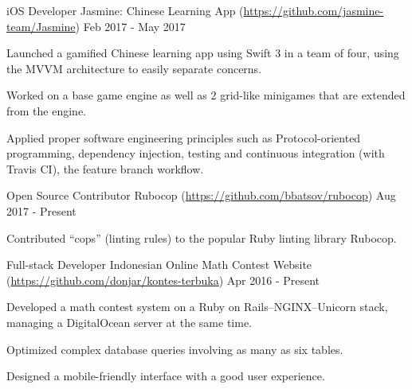 

\begin{cventries}

	\cventry
	{iOS Developer} %
	{Jasmine: Chinese Learning App (\url{https://github.com/jasmine-team/Jasmine})} %
	{} %
	{Feb 2017 - May 2017} %
	{
		\begin{cvitems} %
		\item {Launched a gamified Chinese learning app using Swift 3 in a team of four, using the MVVM architecture to easily separate concerns.}
		\item {Worked on a base game engine as well as 2 grid-like minigames that are extended from the engine.}
		\item {Applied proper software engineering principles such as Protocol-oriented programming, dependency injection, testing and continuous integration (with Travis CI), the feature branch workflow.}
		\end{cvitems}
	}

	\cventry
	{Open Source Contributor} %
	{Rubocop (\url{https://github.com/bbatsov/rubocop})} %
	{} %
	{Aug 2017 - Present} %
	{
		\begin{cvitems} %
		\item {Contributed ``cops'' (linting rules) to the popular Ruby linting library Rubocop.}
		\end{cvitems}
	}

	\cventry
	{Full-stack Developer} %
	{Indonesian Online Math Contest Website (\url{https://github.com/donjar/kontes-terbuka})} %
	{} %
	{Apr 2016 - Present} %
	{
		\begin{cvitems} %
		\item {Developed a math contest system on a Ruby on Rails--NGINX--Unicorn stack, managing a DigitalOcean server at the same time.}
		\item {Optimized complex database queries involving as many as six tables.}
		\item {Designed a mobile-friendly interface with a good user experience.}
		\end{cvitems}
	}

\end{cventries}
